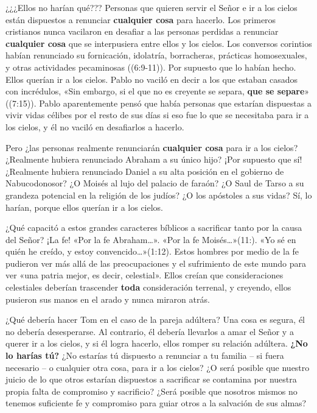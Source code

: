 \documentclass[12pt, twoside, openright]{book}
\begin{document}
¿¿¿Ellos no harían qué??? Personas que quieren servir el Señor e ir a los cielos están dispuestos a renunciar \textbf{cualquier cosa} para hacerlo. Los primeros cristianos nunca vacilaron en desafiar a las personas perdidas a renunciar \textbf{cualquier cosa} que se interpusiera entre ellos y los cielos. Los conversos corintios habían renunciado su fornicación, idolatría, borracheras, prácticas homosexuales, y otras actividades pecaminosas ((6:9-11)). Por supuesto que lo habían hecho. Ellos querían ir a los cielos. Pablo no vaciló en decir a los que estaban casados con incrédulos, «Sin embargo, si el que no es creyente se separa, \textbf{que se separe}» ((7:15)). Pablo aparentemente pensó que había personas que estarían dispuestas a vivir vidas célibes por el resto de sus días si eso fue lo que se necesitaba para ir a los cielos, y él no vaciló en desafiarlos a hacerlo.

Pero ¿las personas realmente renunciarán \textbf{cualquier cosa} para ir a los cielos? ¿Realmente hubiera renunciado Abraham a su único hijo? ¡Por supuesto que sí! ¿Realmente hubiera renunciado Daniel a su alta posición en el gobierno de Nabucodonosor? ¿O Moisés al lujo del palacio de faraón? ¿O Saul de Tarso a su grandeza potencial en la religión de los judíos? ¿O los apóstoles a sus vidas? Sí, lo harían, porque ellos querían ir a los cielos.

¿Qué capacitó a estos grandes caracteres bíblicos a sacrificar tanto por la causa del Señor? ¡La fe! «Por la fe Abraham…». «Por la fe Moisés…»(11:). «Yo sé en quién he creído, y estoy convencido…»(1:12). Estos hombres por medio de la fe pudieron ver más allá de las preocupaciones y el sufrimiento de este mundo para ver «una patria mejor, es decir, celestial». Ellos creían que consideraciones celestiales deberían trascender \textbf{toda} consideración terrenal, y creyendo, ellos pusieron sus manos en el arado y nunca miraron atrás. 

¿Qué debería hacer Tom en el caso de la pareja adúltera? Una cosa es segura, él no debería desesperarse. Al contrario, él debería llevarlos a amar el Señor y a querer ir a los cielos, y si él logra hacerlo, ellos romper su relación adúltera. \textbf{¿No lo harías tú?} ¿No estarías tú dispuesto a renunciar a tu familia – si fuera necesario – o cualquier otra cosa, para ir a los cielos? ¿O será posible que nuestro juicio de lo que otros estarían dispuestos a sacrificar se contamina por nuestra propia falta de compromiso y sacrificio? ¿Será posible que nosotros mismos no tenemos suficiente fe y compromiso para guiar otros a la salvación de sus almas?
\end{document}
